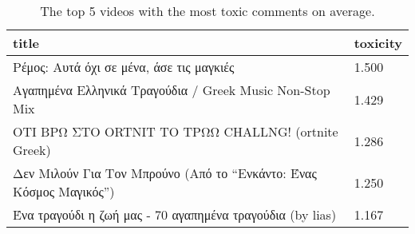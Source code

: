 \begin{table}
\caption{The top 5 videos with the most toxic comments on average.}
\label{tab::toxic_videos}
\begin{tabular}{|p{10cm}|p{1cm}|}
\toprule
title & toxicity \\
\midrule
Ρέμος: Αυτά όχι σε μένα, άσε τις μαγκιές & 1.500 \\
Αγαπημένα Ελληνικά Τραγούδια / Greek Music Non-Stop Mix & 1.429 \\
ΟΤΙ ΒΡΩ ΣΤΟ ORTNIT ΤΟ ΤΡΩΩ CHALLNG! (ortnite Greek) & 1.286 \\
Δεν Μιλούν Για Τον Μπρούνο (Από το “Ενκάντο: Ένας Κόσμος Μαγικός”) & 1.250 \\
Ένα τραγούδι η ζωή μας - 70 αγαπημένα τραγούδια (by lias) & 1.167 \\
\bottomrule
\end{tabular}
\end{table}
